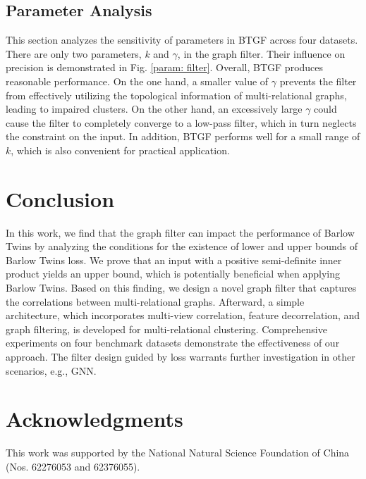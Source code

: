 \documentclass[letterpaper]{article} %
\begin{document}
\subsection{Parameter Analysis}

This section analyzes the sensitivity of parameters in BTGF across four datasets. There are only two parameters, $k$ and $\gamma$, in the graph filter. Their influence on precision is demonstrated in Fig. \ref{param: filter}. Overall, BTGF produces reasonable performance. On the one hand, a smaller value of $\gamma$ prevents the filter from effectively utilizing the topological information of multi-relational graphs, leading to impaired clusters. On the other hand, an excessively large $\gamma$ could cause the filter to completely converge to a low-pass filter, which in turn neglects the constraint on the input. In addition, BTGF performs well for a small range of $k$, which is also convenient for practical application. %


\section{Conclusion}
In this work, we find that the graph filter can impact the performance of Barlow Twins by analyzing the conditions for the existence of lower and upper bounds of Barlow Twins loss. We prove that an input with a positive semi-definite inner product yields an upper bound, which is potentially beneficial when applying Barlow Twins. Based on this finding, we design a novel graph filter that captures the correlations between multi-relational graphs. Afterward, a simple architecture, which incorporates multi-view correlation, feature decorrelation, and graph filtering, is developed for multi-relational clustering. Comprehensive experiments on four benchmark datasets demonstrate the effectiveness of our approach. The filter design guided by loss warrants further investigation in other scenarios, e.g., GNN.


\section{Acknowledgments}
This work was supported by the National Natural Science
Foundation of China (Nos. 62276053 and 62376055).
\end{document}
